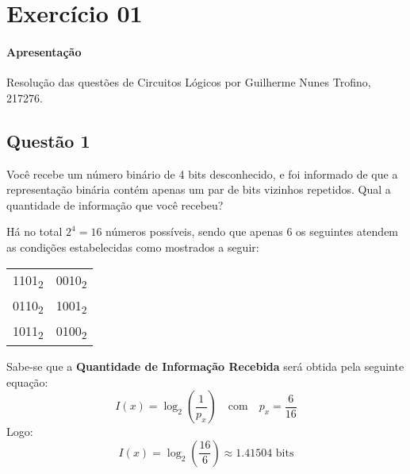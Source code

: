 \documentclass{article}
\begin{document}
    \section{Exercício 01}
        \paragraph{Apresentação}Resolução das questões de Circuitos Lógicos por Guilherme Nunes Trofino, 217276.

        \subsection{Questão 1}
            \begin{exercise}
                Você recebe um número binário de 4 bits desconhecido, e foi informado de que a representação binária contém apenas um par de bits vizinhos repetidos. Qual a quantidade de informação que você recebeu?
            \end{exercise}
            \begin{resolution}
                Há no total $2^{4} = 16$ números possíveis, sendo que apenas $6$ os seguintes atendem as condições estabelecidas como mostrados a seguir:
                    \begin{table}[H]
                        \centering
                        \begin{tabular}[]{cc}\hline
                            1101\textsubscript{2} & 0010\textsubscript{2}\\
                            0110\textsubscript{2} & 1001\textsubscript{2}\\
                            1011\textsubscript{2} & 0100\textsubscript{2}\\\hline
                        \end{tabular}
                    \end{table}\noindent
                Sabe-se que a \textbf{Quantidade de Informação Recebida} será obtida pela seguinte equação:
                    \begin{equation*}
                        I(x) = \log_{2}\left(\frac{1}{p_{x}}\right)
                        \quad\text{com}\quad
                        p_{x} = \frac{6}{16}
                    \end{equation*}
                Logo:
                    \begin{equation*}
                        I(x) = \log_{2}\left(\frac{16}{6}\right) \approx \boxed{1.41504 \text{ bits}}
                    \end{equation*}
            \end{resolution}
\end{document}
